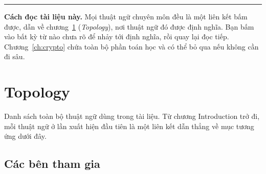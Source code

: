 \documentclass[a4paper,11pt,oneside]{report}
\theoremstyle{definition}
\theoremstyle{plain}
\begin{document}
\vspace{1.6cm}
\noindent\rule{\textwidth}{0.4pt}

\bigskip
\noindent
\textbf{\sffamily Cách đọc tài liệu này.}
Mọi thuật ngữ chuyên môn đều là một liên kết bấm được, dẫn về chương~\ref{ch:topology}
(\emph{Topology}), nơi thuật ngữ đó được định nghĩa. Bạn bấm vào bất kỳ từ nào chưa rõ để
nhảy tới định nghĩa, rồi quay lại đọc tiếp. Chương~\ref{ch:crypto} chứa toàn bộ phần toán học và
có thể bỏ qua nếu không cần đi sâu.

\newpage

\tableofcontents

\chapter{Topology}
\label{ch:topology}

Danh sách toàn bộ thuật ngữ dùng trong tài liệu. Từ chương Introduction trở đi, mỗi thuật ngữ
ở lần xuất hiện đầu tiên là một liên kết dẫn thẳng về mục tương ứng dưới đây.

\section*{Các bên tham gia}
\end{document}
